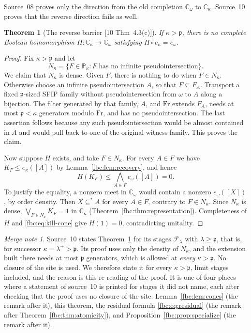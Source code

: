 \documentclass[11pt,letterpaper]{article}
\newtheorem{theorem}{Theorem}[section]
\theoremstyle{definition}
\theoremstyle{remark}
\newtheorem*{mergenote}{Merge note}
\newcommand{\om}{\omega}
\newcommand{\Fr}{\mathrm{Fr}}
\newcommand{\C}{\mathbb C}
\newcommand{\PP}{\mathbb P}
\newcommand{\cp}{\mathfrak p}
\newcommand{\src}[1]{\textup{[#1]}}
\begin{document}
Source~08 proves only the direction from the old completion $\C_\om$ to
$\C_\kappa$. Source~10 proves that the reverse direction fails as well.

\begin{theorem}[The reverse barrier \src{10 Thm~4.3(c)}]
\label{fbc:thm:reverse}
If $\kappa>\cp$, there is no complete Boolean homomorphism
$H:\C_\kappa\to\C_\om$ satisfying $H\circ e_\kappa=e_\om$.
\end{theorem}
\begin{proof}
Fix $\kappa>\cp$ and let
\[
 N_\kappa=\{F\in\PP_\kappa:F\text{ has no infinite pseudointersection}\}.
\]
We claim that $N_\kappa$ is dense. Given $F$, there is nothing to do
when $F\in N_\kappa$. Otherwise choose an infinite pseudointersection
$A$, so that $F\subseteq F_A$. Transport a fixed $\cp$-sized SFIP
family without pseudointersection from $\om$ to $A$ along a bijection.
The filter generated by that family, $A$, and $\Fr$ extends $F_A$,
needs at most $\cp<\kappa$ generators modulo $\Fr$, and has no
pseudointersection. The last assertion follows because any such
pseudointersection would be almost contained in $A$ and would pull back
to one of the original witness family. This proves the claim.

Now suppose $H$ exists, and take $F\in N_\kappa$. For every $A\in F$ we
have $K_F\leq e_\kappa([A])$ by Lemma~\ref{fbc:lem:recovery}, and hence
\begin{equation}\label{fbc:eq:kill-cone}
 H(K_F)\leq\bigwedge_{A\in F} e_\om([A])=0.
\end{equation}
To justify the equality, a nonzero meet in $\C_\om$ would contain a
nonzero $e_\om([X])$, by order density. Then $X\subseteq^*A$ for every
$A\in F$, contrary to $F\in N_\kappa$. Since $N_\kappa$ is dense,
$\bigvee_{F\in N_\kappa}K_F=1$ in $\C_\kappa$
(Theorem~\ref{fbc:thm:representation}). Completeness of $H$ and
\eqref{fbc:eq:kill-cone} give $H(1)=0$, contradicting unitality.
\end{proof}

\begin{mergenote}
Source~10 states Theorem~\ref{fbc:thm:reverse} for its stages
$\mathcal F_\lambda$ with $\lambda\geq\cp$, that is, for successor
$\kappa=\lambda^+>\cp$. Its proof uses only the density of $N_\kappa$,
and the extension built there needs at most $\cp$ generators, which is
allowed at \emph{every} $\kappa>\cp$. No closure of the site is used.
We therefore state it for every $\kappa>\cp$, limit stages included,
and the reason is this re-reading of the proof. It is one of four places
where a statement of source~10 is printed for stages it did not name,
each after checking that the proof uses no closure of the site: Lemma~\ref{fbc:lem:cones}
(the remark after it), this theorem, the residual formula
\eqref{fbc:eq:residual} (the remark after Theorem~\ref{fbc:thm:atomicity}),
and Proposition~\ref{fbc:prop:specialize} (the remark after it).
\end{mergenote}
\end{document}
